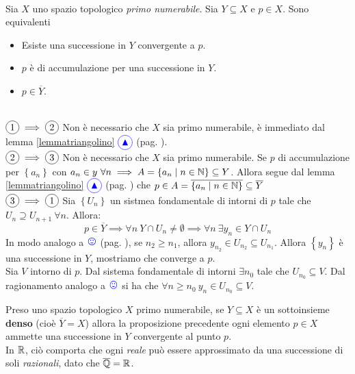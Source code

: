 \begin{proposition}~{}\\
	Sia $X$ uno spazio topologico \textit{primo numerabile}. Sia $Y\subseteq X$ e $p\in X$. Sono equivalenti
	\begin{itemize}
		\item Esiste una successione in $Y$ convergente a $p$.
		\item $p$ è di accumulazione per una successione in $Y$.
		\item $p\in \overline{Y}$.
	\end{itemize}
\vspace{-3mm}
\end{proposition}
\begin{demonstration}~{}\\
$\circled{1}\implies\circled{2}$ Non è necessario che $X$ sia primo numerabile, è immediato dal lemma \ref{lemmatriangolino} $\textcolor{blue}{\circled{{\large \blacktriangle}}}$ (pag. \pageref{lemmatriangolino}).\\
$\circled{2}\implies\circled{3}$ Non è necessario che $X$ sia primo numerabile. Se $p$ di accumulazione per $\left\{a_n\right\}$ con $a_n\in y\ \forall n\implies A=\left\{a_n\mid n\in \mathbb{N}\right\}\subseteq Y$. Allora segue dal lemma \ref{lemmatriangolino} $\textcolor{blue}{\circled{{\large \blacktriangle}}}$ (pag. \pageref{lemmatriangolino}) che $p\in A=\overline{\left\{a_n\mid n\in \mathbb{N}\right\}}\subseteq \overline{Y}$ \\
$\circled{3}\implies\circled{1}$ Sia $\left\{U_n\right\}$ un sistmea fondamentale di intorni di $p$ tale che $U_n\supseteq U_{n+1}\ \forall n$. Allora:
\begin{equation*}
	p\in \overline{Y}\implies \forall n\ Y\cap U_n\neq\emptyset\implies\forall n\ \exists y_n\in Y\cap U_n
\end{equation*}
In modo analogo a $\textcolor{blue}{{\large \smiley{}}}$ (pag. \pageref{notasorridente}), se $n_2\geq n_1$, allora $y_{n_2}\in U_{n_2}\subseteq U_{n_1}$. Allora $\left\{y_n\right\}$ è una successione in $Y$, mostriamo che converge a $p$.\\
Sia $V$ intorno di $p$. Dal sistema fondamentale di intorni $\exists n_0$ tale che $U_{n_0}\subseteq V$. Dal ragionamento analogo a $\textcolor{blue}{{\large \smiley{}}}$ si ha che $\forall n\geq n_0\ y_n\in U_{n_0}\subseteq V$.
\end{demonstration}
\begin{observe}\label{densitaesuccessioni}
	Preso uno spazio topologico $X$ primo numerabile, se $Y\subseteq X$ è un sottoinsieme \textbf{denso} (cioè $\overline{Y}=X$) allora la proposizione precedente ogni elemento $p\in X$ ammette una successione in $Y$ convergente al punto $p$.\\
	In $\mathbb{R}$, ciò comporta che ogni \textit{reale} può essere approssimato da una successione di soli \textit{razionali}, dato che $\overline{\mathbb{Q}}=\mathbb{R}$.
\end{observe}
